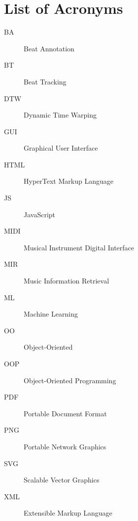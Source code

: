 \chapter*{List of Acronyms}

\begin{description}
  \item[BA] Beat Annotation
  \item[BT] Beat Tracking
  \item[DTW] Dynamic Time Warping
  \item[GUI] Graphical User Interface
  \item[HTML] HyperText Markup Language
  \item[JS] JavaScript
  \item[MIDI] Musical Instrument Digital Interface
  \item[MIR] Music Information Retrieval
  \item[ML] Machine Learning
  \item[OO] Object-Oriented
  \item[OOP] Object-Oriented Programming
  \item[PDF] Portable Document Format
  \item[PNG] Portable Network Graphics
  \item[SVG] Scalable Vector Graphics
  \item[XML] Extensible Markup Language
\end{description}
